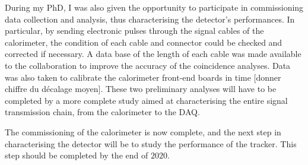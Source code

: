 During my PhD, I was also given the opportunity to participate in commissioning data collection and analysis, thus characterising the detector's performances.
In particular, by sending electronic pulses through the signal cables of the calorimeter, the condition of each cable and connector could be checked and corrected if necessary.
A data base of the length of each cable was made available to the collaboration to improve the accuracy of the coincidence analyses.
Data was also taken to calibrate the calorimeter front-end boards in time [donner chiffre du décalage moyen].
These two preliminary analyses will have to be completed by a more complete study aimed at characterising the entire signal transmission chain, from the calorimeter to the DAQ.

The commissioning of the calorimeter is now complete, and the next step in characterising the detector will be to study the performance of the tracker.
This step should be completed by the end of $2020$.
